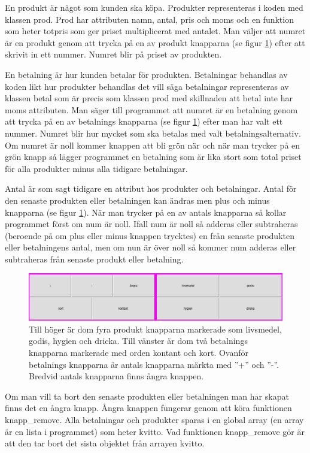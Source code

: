 \documentclass[a4paper, 12pt]{article}
\begin{document}
En produkt är något som kunden ska köpa. Produkter representeras i koden med klassen prod. Prod har attributen namn, antal, pris och moms och en funktion som heter totpris som ger priset multiplicerat med antalet. 
Man väljer att numret är en produkt genom att trycka på en av produkt knapparna (se figur \ref{fig:3alt}) efter att skrivit in ett nummer. Numret blir på priset av produkten.


En betalning är hur kunden betalar för produkten. Betalningar behandlas av koden likt hur produkter behandlas det vill säga
betalningar representeras av klassen betal som är precis som klassen prod med skillnaden att betal inte har moms attributen. Man säger till programmet att numret är en betalning genom att trycka på en av betalnings knapparna (se figur \ref{fig:3alt}) efter man har valt ett nummer. Numret blir hur mycket som ska betalas med valt betalningsalternativ. Om numret är noll kommer knappen att bli grön när och när man trycker på en grön knapp så lägger programmet en betalning som är lika stort som total priset för alla produkter minus alla tidigare betalningar.


Antal är som sagt tidigare en attribut hos produkter och betalningar. Antal för den senaste produkten eller betalningen kan ändras men plus och minus knapparna (se figur \ref{fig:3alt}).
När man trycker på en av antals knapparna så kollar programmet först om num är noll. Ifall num är noll så adderas eller subtraheras (beroende på om plus eller minus knappen trycktes) en från senaste produkten eller betalningens antal, men om nun är över noll så kommer num adderas eller subtraheras från senaste produkt eller betalning. 


\begin{figure}[h!]
  \includegraphics[width=\linewidth]{img/3alt.png}
  \caption{
	  Till höger är dom fyra produkt knapparna markerade som livsmedel, godis, hygien och dricka.
	  Till vänster är dom två betalnings knapparna markerade med orden kontant och kort.
	  Ovanför betalnings knapparna är antals knapparna märkta med ''+'' och ''-''.
	  Bredvid antals knapparna finns ångra knappen. 
	}
  \label{fig:3alt}
\end{figure}


Om man vill ta bort den senaste produkten eller betalningen man har skapat finns det en ångra knapp.
Ångra knappen fungerar genom att köra funktionen knapp\_remove. 
Alla betalningar och produkter sparas i en global array (en array är en lista i programmet) som heter kvitto. Vad funktionen knapp\_remove gör är att den tar bort det sista objektet från arrayen kvitto.
\end{document}
